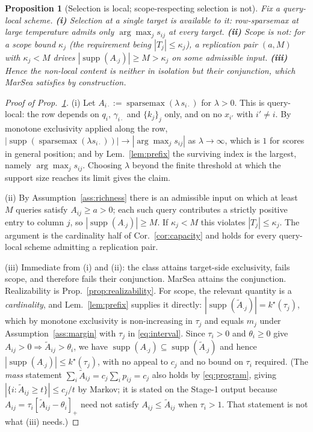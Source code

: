 \documentclass{article}
\newtheorem{proposition}{Proposition}
\newcommand{\supp}{\operatorname{supp}}
\begin{document}
\begin{proposition}[Selection is local; scope-respecting selection is not]
\label{prop:scope}
Fix a query-local scheme. \textbf{(i)} Selection at a \emph{single} target is available to it:
row-sparsemax at large temperature admits only $\arg\max_j s_{ij}$ at every target.
\textbf{(ii)} Scope is not: for a scope bound $\kappa_j$ (the requirement being
$|T_j|\le\kappa_j$), a replication pair $(a,M)$ with $\kappa_j<M$ drives
$|\supp(A_{\cdot j})|\ge M>\kappa_j$ on some admissible input. \textbf{(iii)} Hence the non-local content is
neither in isolation but their \emph{conjunction}, which MarSea satisfies by construction.
\end{proposition}

\begin{proof}[Proof of Prop.~\ref{prop:scope}]
(i) Let $A_{i\cdot} := \operatorname{sparsemax}(\lambda\, s_{i\cdot})$ for $\lambda > 0$. This
is query-local: the row depends on $q_i$, $\gamma_{i\cdot}$ and $\{k_j\}_j$ only, and on no
$x_{i'}$ with $i' \neq i$. By monotone exclusivity applied along the row,
$|\supp(\operatorname{sparsemax}(\lambda s_{i\cdot}))| \to |\arg\max_j s_{ij}|$ as
$\lambda \to \infty$, which is $1$ for scores in general position; and by
Lem.~\ref{lem:prefix} the surviving index is the largest, namely $\arg\max_j s_{ij}$. Choosing
$\lambda$ beyond the finite threshold at which the support size reaches its limit gives the
claim.

(ii) By Assumption~\ref{ass:richness} there is an admissible input on which at least $M$
queries satisfy $A_{ij} \ge a > 0$; each such query contributes a strictly positive entry to
column $j$, so $|\supp(A_{\cdot j})| \ge M$. If $\kappa_j < M$ this violates
$|T_j| \le \kappa_j$. The argument is the cardinality half of Cor.~\ref{cor:capacity} and
holds for every query-local scheme admitting a replication pair.

(iii) Immediate from (i) and (ii): the class attains target-side exclusivity, fails scope, and
therefore fails their conjunction. MarSea attains the conjunction. Realizability is
Prop.~\ref{prop:realizability}. For scope, the relevant quantity is a \emph{cardinality}, and
Lem.~\ref{lem:prefix} supplies it directly: $|\supp(\tilde A_{\cdot j})| = k^\star(\tau_j)$,
which by monotone exclusivity is non-increasing in $\tau_j$ and equals $m_j$ under
Assumption~\ref{ass:margin} with $\tau_j$ in \eqref{eq:interval}. Since $\tau_i>0$ and
$\theta_i\ge0$ give $A_{ij}>0 \Rightarrow \tilde A_{ij}>\theta_i$, we have
$\supp(A_{\cdot j})\subseteq\supp(\tilde A_{\cdot j})$ and hence
$|\supp(A_{\cdot j})|\le k^\star(\tau_j)$, with no appeal to $c_j$ and no bound on $\tau_i$
required. (The \emph{mass} statement $\sum_i \tilde A_{ij} = c_j\sum_i p_{ij} = c_j$ also holds
by \eqref{eq:program}, giving $|\{i : \tilde A_{ij} \ge t\}| \le c_j/t$ by Markov; it is stated
on the Stage-1 output because $A_{ij} = \tau_i[\tilde A_{ij}-\theta_i]_+$ need not satisfy
$A_{ij}\le\tilde A_{ij}$ when $\tau_i>1$. That statement is not what (iii) needs.)
\end{proof}
\end{document}

